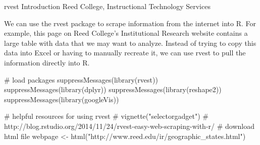 rvest Introduction
Reed College, Instructional Technology Services

We can use the rvest package to scrape information from the internet into R. For example, this page on Reed College’s Institutional Research website contains a large table with data that we may want to analyze. Instead of trying to copy this data into Excel or having to manually recreate it, we can use rvest to pull the information directly into R.

# load packages 
suppressMessages(library(rvest))
suppressMessages(library(dplyr))
suppressMessages(library(reshape2))
suppressMessages(library(googleVis))

# helpful resources for using rvest 
  # vignette("selectorgadget")
  # http://blog.rstudio.org/2014/11/24/rvest-easy-web-scraping-with-r/
# download html file
webpage <- html("http://www.reed.edu/ir/geographic_states.html")

